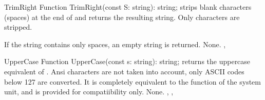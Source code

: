 
 
\begin{function}{TrimRight}
\Declaration
Function TrimRight(const S: string): string;
\Description
{} strips blank characters (spaces) at the end of 
and returns the resulting string. Only  characters are stripped.

If the string contains only spaces, an empty string is returned.
\Errors
None.
\SeeAlso
{}, 
\end{function}



 
\begin{function}{UpperCase}
\Declaration
Function UpperCase(const s: string): string;
\Description
{} returns the uppercase equivalent of . Ansi characters
are not taken into account, only ASCII codes below 127 are converted. It is 
completely equivalent to the  function of the system unit, and is
provided for compatiibility only.
\Errors
None.
\SeeAlso
{}, , 
\Errors
\SeeAlso
\end{function}


 
